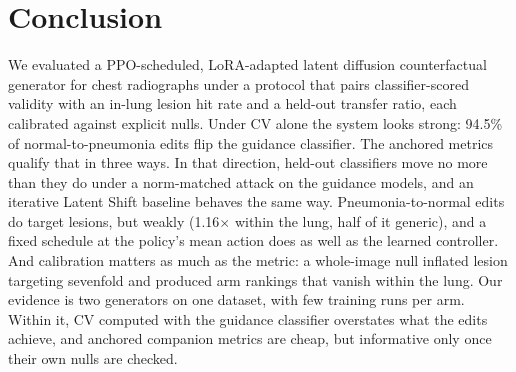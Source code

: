 \section{Conclusion}
\label{sec:conclusion}

We evaluated a PPO-scheduled, LoRA-adapted latent diffusion counterfactual generator for chest radiographs under a protocol that pairs classifier-scored validity with an in-lung lesion hit rate and a held-out transfer ratio, each calibrated against explicit nulls. Under CV alone the system looks strong: 94.5\% of normal-to-pneumonia edits flip the guidance classifier. The anchored metrics qualify that in three ways. In that direction, held-out classifiers move no more than they do under a norm-matched attack on the guidance models, and an iterative Latent Shift baseline behaves the same way. Pneumonia-to-normal edits do target lesions, but weakly (1.16$\times$ within the lung, half of it generic), and a fixed schedule at the policy's mean action does as well as the learned controller. And calibration matters as much as the metric: a whole-image null inflated lesion targeting sevenfold and produced arm rankings that vanish within the lung. Our evidence is two generators on one dataset, with few training runs per arm. Within it, CV computed with the guidance classifier overstates what the edits achieve, and anchored companion metrics are cheap, but informative only once their own nulls are checked.

